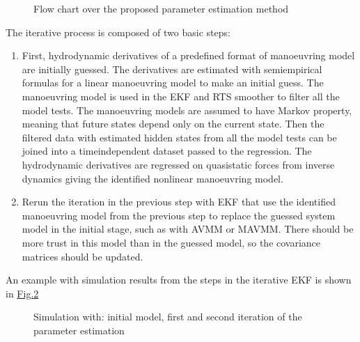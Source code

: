 \documentclass[review]{elsarticle}
\let\sphinxpxdimen\pdfpxdimen\else\newdimen\sphinxpxdimen
\begin{document}
\begin{figure}[H]
\centering
\capstart

\noindent\sphinxincludegraphics[width=500\sphinxpxdimen]{{method}.png}
\caption{Flow chart over the proposed parameter estimation method}\label{\detokenize{01.01_method:overview}}\end{figure}

\sphinxAtStartPar
The iterative process is composed of two basic steps:
\begin{enumerate}
%
\item {} 
\sphinxAtStartPar
First, hydrodynamic derivatives of a predefined format of manoeuvring model are initially guessed. The derivatives
are estimated with semi\sphinxhyphen{}empirical formulas for a linear manoeuvring model to make an initial guess. The manoeuvring model is
used in the EKF and RTS smoother to filter all the model tests. The manoeuvring models are assumed to have
Markov property, meaning that future states depend only on the current state. Then the filtered data
with estimated hidden states from all the model tests can be joined into a time\sphinxhyphen{}independent dataset
passed to the regression. The hydrodynamic derivatives are regressed on quasi\sphinxhyphen{}static forces
from inverse dynamics giving the identified nonlinear manoeuvring model.

\item {} 
\sphinxAtStartPar
Re\sphinxhyphen{}run the iteration in the previous step with EKF that use the identified manoeuvring model from the previous
step to replace the guessed system model in the initial stage, such as with AVMM or MAVMM. There
should be more trust in this model than in the guessed model, so the covariance matrices should be
updated.

\end{enumerate}

\sphinxAtStartPar
An example with simulation results from the steps in the iterative EKF is shown in \hyperref[\detokenize{01.01_method:iterations}]{Fig.\@ \ref{\detokenize{01.01_method:iterations}}}

\begin{figure}[H]
\centering
\capstart

\noindent{}
\caption{Simulation with: initial model, first and second iteration of the parameter estimation}\label{\detokenize{01.01_method:iterations}}\end{figure}
\end{document}
